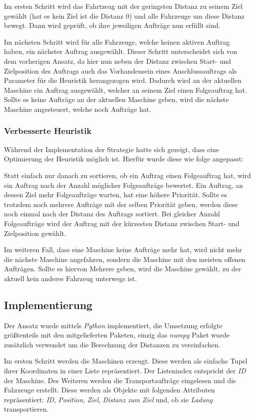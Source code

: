 \documentclass[ngerman]{tudscrreprt}
\begin{document}
Im ersten Schritt wird das Fahrtzeug mit der geringsten Distanz zu seinem Ziel gewählt
(hat es kein Ziel ist die Distanz \num{0}) und alle Fahrzeuge um diese Distanz bewegt.
Dann wird geprüft, ob ihre jeweiligen Aufträge nun erfüllt sind.

Im nächsten Schritt wird für alle Fahrzeuge, welche keinen aktiven Auftrag haben, ein
nächster Auftrag ausgewählt. Dieser Schritt unterscheidet sich von dem vorherigen Ansatz,
da hier nun neben der Distanz zwischen Start- und Zielposition des Auftrags auch das
Vorhandensein eines Anschlussauftrags als Parameter für die Heuristik herangezogen wird.
Dadurch wird an der aktuellen Maschine ein Auftrag ausgewählt, welcher an seinem Ziel
einen Folgeauftrag hat. Sollte es keine Aufträge an der aktuellen Maschine geben, wird
die nächste Maschine angesteuert, welche noch Aufträge hat.

\subsubsection{Verbesserte Heuristik}
Während der Implementation der Strategie hatte sich gezeigt, dass eine Optimierung der
Heuristik möglich ist. Hierfür wurde diese wie folge angepasst:

Statt einfach nur danach zu sortieren, ob ein Auftrag einen Folgeauftrag hat, wird ein
Auftrag nach der Anzahl möglicher Folgeaufträge bewertet. Ein Auftrag, an dessen Ziel
mehr Folgeaufträge warten, hat eine höhere Priorität. Sollte es trotzdem noch mehrere
Aufträge mit der selben Priorität geben, werden diese noch einmal nach der Distanz des
Auftrags sortiert. Bei gleicher Anzahl Folgeaufträge wird der Auftrag mit der kürzesten
Distanz zwischen Start- und Zielposition gewählt.

Im weiteren Fall, dass eine Maschine keine Aufträge mehr hat, wird nicht mehr die nächste
Maschine angefahren, sondern die Maschine mit den meisten offenen Aufträgen. Sollte es
hiervon Mehrere geben, wird die Maschine gewählt, zu der aktuell kein anderes Fahrzeug
unterwegs ist.


\subsection{Implementierung}
Der Ansatz wurde mittels \emph{Python} implementiert, die Umsetzung erfolgte größtenteils
mit den mitgelieferten Paketen, einzig das \emph{numpy} Paket wurde zusätzlich verwendet
um die Berechnung der Distanzen zu vereinfachen.

Im ersten Schritt werden die Maschinen erzeugt. Diese werden als einfache Tupel ihrer
Koordinaten in einer Liste repräsentiert. Der Listenindex entspricht der \emph{ID} der
Maschine. Des Weiteren werden die Transportaufträge eingelesen und die Fahrzeuge
erstellt. Diese werden als Objekte mit folgenden Attributen repräsentiert: \emph{ID},
\emph{Position}, \emph{Ziel}, \emph{Distanz zum Ziel} und, ob sie \emph{Ladung}
transportieren.
\end{document}
